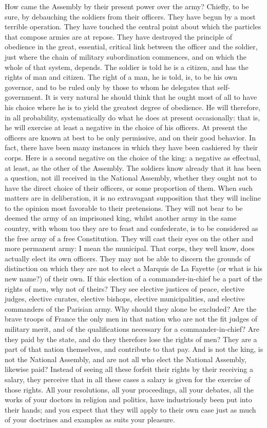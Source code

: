 How came the Assembly by their present power over the army? Chiefly, to be sure, by debauching the soldiers from their officers. They have begun by a most terrible operation. They have touched the central point about which the particles that compose armies are at repose. They have destroyed the principle of obedience in the great, essential, critical link between the officer and the soldier, just where the chain of military subordination commences, and on which the whole of that system, depends. The soldier is told he is a citizen, and has the rights of man and citizen. The right of a man, he is told, is, to be his own governor, and to be ruled only by those to whom he delegates that self-government. It is very natural he should think that he ought most of all to have his choice where he is to yield the greatest degree of obedience. He will therefore, in all probability, systematically do what he does at present occasionally: that is, he will exercise at least a negative in the choice of his officers. At present the officers are known at best to be only permissive, and on their good behavior. In fact, there have been many instances in which they have been cashiered by their corps. Here is a second negative on the choice of the king: a negative as effectual, at least, as the other of the Assembly. The soldiers know already that it has been a question, not ill received in the National Assembly, whether they ought not to have the direct choice of their officers, or some proportion of them. When such matters are in deliberation, it is no extravagant supposition that they will incline to the opinion most favorable to their pretensions. They will not bear to be deemed the army of an imprisoned king, whilst another army in the same country, with whom too they are to feast and confederate, is to be considered as the free army of a free Constitution. They will cast their eyes on the other and more permanent army: I mean the municipal. That corps, they well know, does actually elect its own officers. They may not be able to discern the grounds of distinction on which they are not to elect a Marquis de La Fayette (or what is his new name?) of their own. If this election of a commander-in-chief be a part of the rights of men, why not of theirs? They see elective justices of peace, elective judges, elective curates, elective bishops, elective municipalities, and elective commanders of the Parisian army. Why should they alone be excluded? Are the brave troops of France the only men in that nation who are not the fit judges of military merit, and of the qualifications necessary for a commander-in-chief? Are they paid by the state, and do they therefore lose the rights of men? They are a part of that nation themselves, and contribute to that pay. And is not the king, is not the National Assembly, and are not all who elect the National Assembly, likewise paid? Instead of seeing all these forfeit their rights by their receiving a salary, they perceive that in all these cases a salary is given for the exercise of those rights. All your resolutions, all your proceedings, all your debates, all the works of your doctors in religion and politics, have industriously been put into their hands; and you expect that they will apply to their own case just as much of your doctrines and examples as suits your pleasure.

